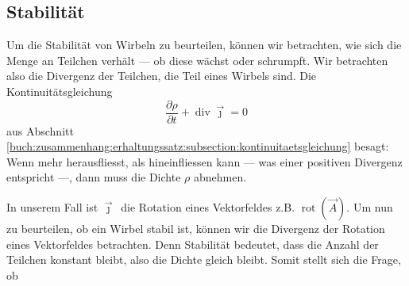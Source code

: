 \subsection{Stabilität}

Um die Stabilität von Wirbeln zu beurteilen, können wir betrachten, wie sich die Menge an Teilchen verhält --- ob diese wächst oder schrumpft. 
Wir betrachten also die Divergenz der Teilchen, die Teil eines Wirbels sind.
Die Kontinuitätsgleichung 
\[
\frac{\partial \rho}{\partial t}
+
\operatorname{div}\vec{\jmath}
=
0
\]
aus Abschnitt \ref{buch:zusammenhang:erhaltungssatz:subsection:kontinuitaetsgleichung} besagt: Wenn mehr herausfliesst, als hineinfliessen kann --- was einer positiven Divergenz entspricht ---, dann muss die Dichte \(\rho\) abnehmen.

In unserem Fall ist \(\vec{\jmath}\,\) die Rotation eines Vektorfeldes z.B. \(\operatorname{rot}(\vec{A})\).
Um nun zu beurteilen, ob ein Wirbel stabil ist, können wir die Divergenz der Rotation eines Vektorfeldes betrachten.
Denn Stabilität bedeutet, dass die Anzahl der Teilchen konstant bleibt, also die Dichte gleich bleibt.
Somit stellt sich die Frage, ob

